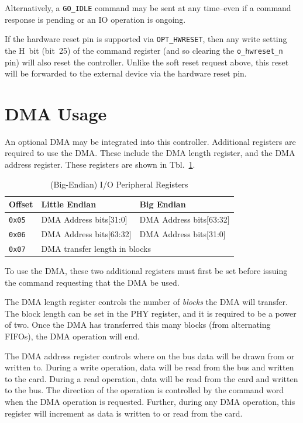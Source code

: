 \documentclass{gqtekspec}
\begin{document}
Alternatively, a {\tt GO\_IDLE} command may be sent at any time--even if
a command response is pending or an IO operation is ongoing.

If the hardware reset pin is supported via {\tt OPT\_HWRESET}, then any write
setting the H~bit (bit~25) of the command register (and so clearing the
{\tt o\_hwreset\_n} pin) will also reset the controller.  Unlike the soft
reset request above, this reset will be forwarded to the external device via
the hardware reset pin.
\section{DMA Usage}
An optional DMA may be integrated into this controller.  Additional registers
are required to use the DMA.  These include the DMA length register, and the
DMA address register.  These registers are shown in Tbl.~\ref{tbl:dma-regs}.
\begin{table}[htbp]
\begin{center}\begin{tabular}{|p{0.75in}|p{1.5in}|p{1.5in}|}\hline
\rowcolor[gray]{0.85} Offset & Little Endian & Big Endian \\\hline\hline
{\tt 0x05} & DMA Address bits[31:0] & DMA Address bits[63:32] \\\hline
{\tt 0x06} & DMA Address bits[63:32] & DMA Address bits[31:0] \\\hline
{\tt 0x07} & \multicolumn{2}{|l|}{DMA transfer length in blocks}\\\hline
\end{tabular}
\caption{(Big-Endian) I/O Peripheral Registers}\label{tbl:dma-regs}
\end{center}\end{table}
To use the DMA, these two additional registers must
first be set before issuing the command requesting that the DMA be used.

The DMA length register controls the number of {\em blocks} the DMA will
transfer.  The block length can be set in the PHY register, and it is required
to be a power of two.  Once the DMA has transferred this many blocks (from
alternating FIFOs), the DMA operation will end.

The DMA address register controls where on the bus data will be drawn from
or written to.  During a write operation, data will be read from the bus
and written to the card.  During a read operation, data will be read from
the card and written to the bus.  The direction of the operation is controlled
by the command word when the DMA operation is requested.  Further, during any
DMA operation, this register will increment as data is written to or read from
the card.
\end{document}
